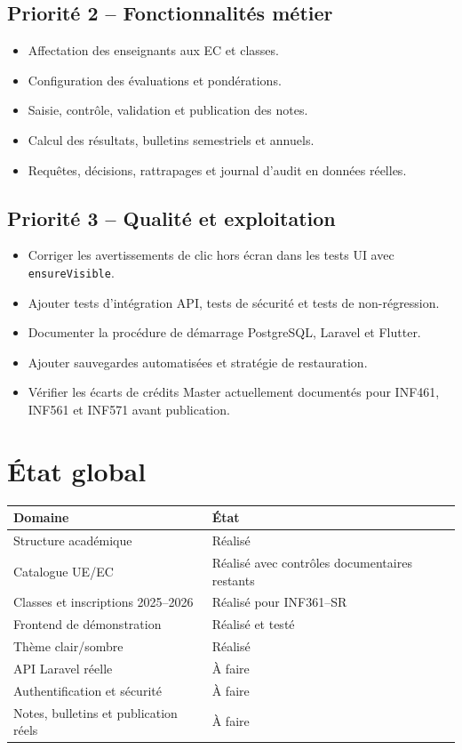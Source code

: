 \documentclass[11pt,a4paper]{article}
\begin{document}
\subsection{Priorité 2 -- Fonctionnalités métier}
\begin{itemize}
  \item Affectation des enseignants aux EC et classes.
  \item Configuration des évaluations et pondérations.
  \item Saisie, contrôle, validation et publication des notes.
  \item Calcul des résultats, bulletins semestriels et annuels.
  \item Requêtes, décisions, rattrapages et journal d'audit en données réelles.
\end{itemize}

\subsection{Priorité 3 -- Qualité et exploitation}
\begin{itemize}
  \item Corriger les avertissements de clic hors écran dans les tests UI avec \texttt{ensureVisible}.
  \item Ajouter tests d'intégration API, tests de sécurité et tests de non-régression.
  \item Documenter la procédure de démarrage PostgreSQL, Laravel et Flutter.
  \item Ajouter sauvegardes automatisées et stratégie de restauration.
  \item Vérifier les écarts de crédits Master actuellement documentés pour INF461, INF561 et INF571 avant publication.
\end{itemize}

\section{État global}
\begin{tabular}{p{}p{}}
\textbf{Domaine} & \textbf{État}\\\hline
Structure académique & Réalisé\\
Catalogue UE/EC & Réalisé avec contrôles documentaires restants\\
Classes et inscriptions 2025--2026 & Réalisé pour INF361--SR\\
Frontend de démonstration & Réalisé et testé\\
Thème clair/sombre & Réalisé\\
API Laravel réelle & À faire\\
Authentification et sécurité & À faire\\
Notes, bulletins et publication réels & À faire\\
\end{tabular}
\end{document}
